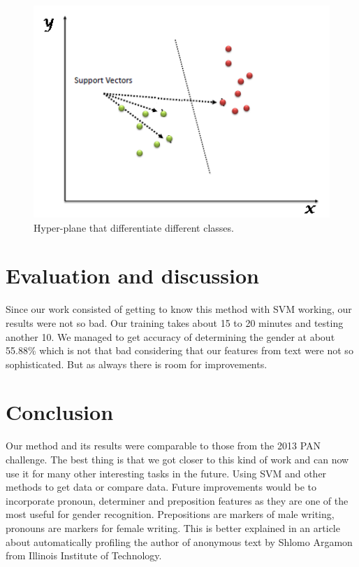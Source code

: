 \documentclass{llncs}
\begin{document}
\begin{figure}[ht!]
\centering
\includegraphics[width=120mm]{SVM_1.png}
\caption{Hyper-plane that differentiate different classes. \cite{SVMphoto}\label{overflow}}
\end{figure}

\newpage

\section{Evaluation and discussion}\label{sec:Others}
Since our work consisted of getting to know this method with SVM working, our results were not so bad. Our training takes about 15 to 20 minutes and testing another 10. We managed to get accuracy of determining the gender at about 55.88\% which is not that bad considering that our features from text were not so sophisticated. But as always there is room for improvements.


\bigskip
\section{Conclusion}\label{sec:Conclusion}

Our method and its results were comparable to those from the 2013 PAN challenge. The best thing is that we got closer to this kind of work and can now use it for many other interesting tasks in the future. Using SVM and other methods to get data or compare data. Future improvements would be to incorporate pronoun, determiner and preposition features as they are one of the most useful for gender recognition. Prepositions are markers of male writing, pronouns are markers for female writing. This is better explained in an article about automatically profiling the author of anonymous text by Shlomo Argamon from Illinois Institute of Technology\cite{Shlomo}.
\end{document}
